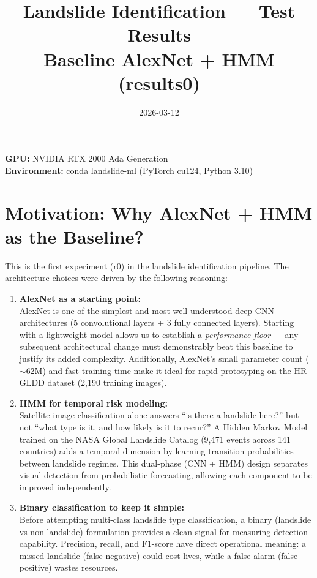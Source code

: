 \documentclass[11pt]{article}
\title{Landslide Identification — Test Results \\ \large Baseline AlexNet + HMM (results0)}
\author{}
\date{2026-03-12}
\begin{document}
\maketitle

\noindent\textbf{GPU:} NVIDIA RTX 2000 Ada Generation \\
\textbf{Environment:} conda landslide-ml (PyTorch cu124, Python 3.10) \\

\section{Motivation: Why AlexNet + HMM as the Baseline?}

This is the first experiment (r0) in the landslide identification pipeline. The architecture choices were driven by the following reasoning:

\begin{enumerate}
    \item \textbf{AlexNet as a starting point:}\\
          AlexNet is one of the simplest and most well-understood deep CNN architectures (5 convolutional layers + 3 fully connected layers). Starting with a lightweight model allows us to establish a \textit{performance floor} --- any subsequent architectural change must demonstrably beat this baseline to justify its added complexity. Additionally, AlexNet's small parameter count ($\sim$62M) and fast training time make it ideal for rapid prototyping on the HR-GLDD dataset (2,190 training images).

    \item \textbf{HMM for temporal risk modeling:}\\
          Satellite image classification alone answers ``is there a landslide here?'' but not ``what type is it, and how likely is it to recur?'' A Hidden Markov Model trained on the NASA Global Landslide Catalog (9,471 events across 141 countries) adds a temporal dimension by learning transition probabilities between landslide regimes. This dual-phase (CNN + HMM) design separates visual detection from probabilistic forecasting, allowing each component to be improved independently.

    \item \textbf{Binary classification to keep it simple:}\\
          Before attempting multi-class landslide type classification, a binary (landslide vs non-landslide) formulation provides a clean signal for measuring detection capability. Precision, recall, and F1-score have direct operational meaning: a missed landslide (false negative) could cost lives, while a false alarm (false positive) wastes resources.
\end{enumerate}
\end{document}
